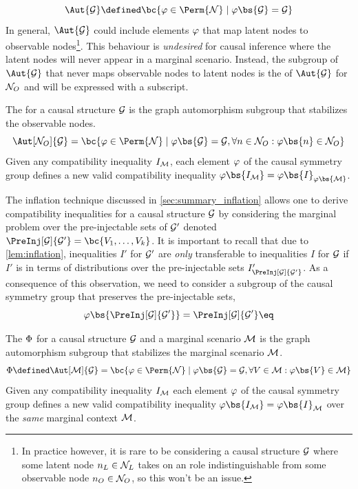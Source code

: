 \documentclass[aps, 10pt, english, twoside, pra, nofootinbib, longbibliography]{revtex4-1}
\begin{document}
    \[ \Aut{\graph} \defined \bc{\gep \in \Perm{\nodes} \mid \gep\bs{\graph} = \graph} \]
    In general, $\Aut{\graph}$ could include elements $\varphi$ that map latent nodes to observable nodes\footnote{In practice however, it is rare to be considering a causal structure $\mathcal{G}$ where some latent node $n_L \in \mathcal{N}_L$ takes on an role indistinguishable from some observable node $n_O \in \mathcal{N}_O$, so this won't be an issue.}. This behaviour is \textit{undesired} for causal inference where the latent nodes will never appear in a marginal scenario. Instead, the subgroup of $\Aut{\graph}$ that never maps observable nodes to latent nodes is the  of $\Aut{\graph}$ for $\mathcal{N}_O$ and will be expressed with a subscript.

    \begin{definition}
        The  for a causal structure $\mathcal{G}$ is the graph automorphism subgroup that stabilizes the observable nodes.
        \[ \Aut[\nodes_O]{\graph} = \bc{\gep \in \Perm{\nodes} \mid \gep\bs{\graph} = \graph, \forall n \in \nodes_O :\gep\bs{n} \in \nodes_O} \]
        Given any compatibility inequality $I_{\mathcal{M}}$, each element $\varphi$ of the causal symmetry group defines a new valid compatibility inequality $\gep\bs{I_{\mscenario}} = \gep\bs{I}_{\gep\bs{\mscenario}}$.
    \end{definition}

    The inflation technique discussed in \cref{sec:summary_inflation} allows one to derive compatibility inequalities for a causal structure $\mathcal{G}$ by considering the marginal problem over the pre-injectable sets of $\mathcal{G}'$ denoted $\PreInj[\graph]{\graph'} = \bc{V_1, \ldots, V_k}$. It is important to recall that due to \cref{lem:inflation}, inequalities $I'$ for $\mathcal{G}'$ are \textit{only} transferable to inequalities $I$ for $\mathcal{G}$ if $I'$ is in terms of distributions over the pre-injectable sets $I'_{\PreInj[\graph]{\graph'}}$. As a consequence of this observation, we need to consider a subgroup of the causal symmetry group that preserves the pre-injectable sets,
    \[ \gep\bs{\PreInj[\graph]{\graph'}} = \PreInj[\graph]{\graph'} \eq \label{eq:preserved_preinj} \]

    \begin{definition}
        The  $\Phi$ for a causal structure $\mathcal{G}$ and a marginal scenario $\mathcal{M}$ is the graph automorphism subgroup that stabilizes the marginal scenario $\mathcal{M}$.
        \[ \gp \defined \Aut[\mscenario]{\graph} = \bc{\gep \in \Perm{\nodes} \mid \gep\bs{\graph} = \graph, \forall V \in \mscenario : \gep\bs{V} \in \mscenario} \]
        Given any compatibility inequality $I_{\mathcal{M}}$ each element $\varphi$ of the causal symmetry group defines a new valid compatibility inequality $\gep\bs{I_{\mscenario}} = \gep\bs{I}_{\mscenario}$ over the \textit{same} marginal context $\mathcal{M}$.
    \end{definition}
\end{document}
